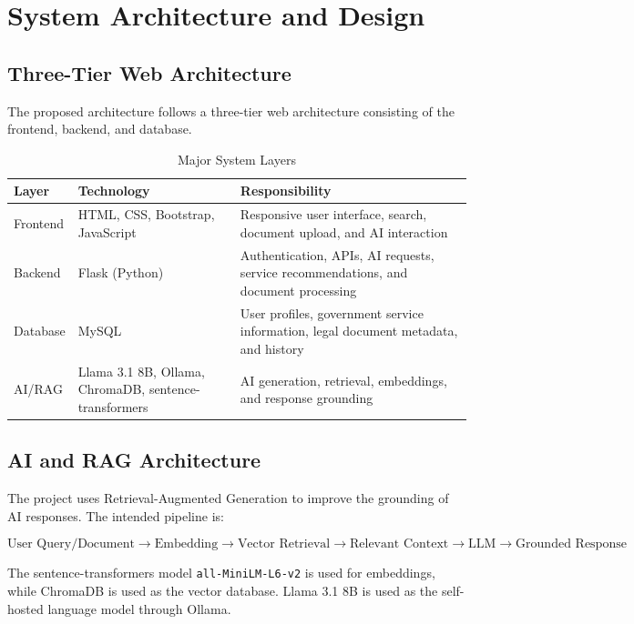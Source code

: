 \documentclass[12pt,a4paper]{report}
\begin{document}
\chapter{System Architecture and Design}

\section{Three-Tier Web Architecture}

The proposed architecture follows a three-tier web architecture consisting of the frontend, backend, and database.

\begin{table}[H]
\centering
\caption{Major System Layers}
\begin{tabular}{p{3.2cm}p{5cm}p{5cm}}
\toprule
\textbf{Layer} & \textbf{Technology} & \textbf{Responsibility} \\
\midrule
Frontend & HTML, CSS, Bootstrap, JavaScript & Responsive user interface, search, document upload, and AI interaction \\
Backend & Flask (Python) & Authentication, APIs, AI requests, service recommendations, and document processing \\
Database & MySQL & User profiles, government service information, legal document metadata, and history \\
AI/RAG & Llama 3.1 8B, Ollama, ChromaDB, sentence-transformers & AI generation, retrieval, embeddings, and response grounding \\
\bottomrule
\end{tabular}
\end{table}

\section{AI and RAG Architecture}

The project uses Retrieval-Augmented Generation to improve the grounding of AI responses. The intended pipeline is:

\[
\text{User Query/Document}
\rightarrow
\text{Embedding}
\rightarrow
\text{Vector Retrieval}
\rightarrow
\text{Relevant Context}
\rightarrow
\text{LLM}
\rightarrow
\text{Grounded Response}
\]

The sentence-transformers model \texttt{all-MiniLM-L6-v2} is used for embeddings, while ChromaDB is used as the vector database. Llama 3.1 8B is used as the self-hosted language model through Ollama.
\end{document}
